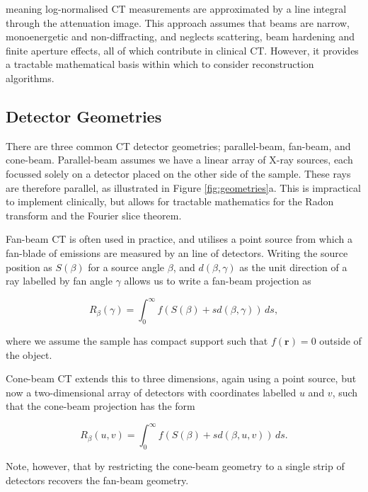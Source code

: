 meaning log-normalised CT measurements are approximated by a line integral through the attenuation image. This approach assumes that beams are narrow, monoenergetic and non-diffracting, and neglects scattering, beam hardening and finite aperture effects, all of which contribute in clinical CT. However, it provides a tractable mathematical basis within which to consider reconstruction algorithms.

\subsection{Detector Geometries}
\label{subsec:detector_geometries}

There are three common CT detector geometries; parallel-beam, fan-beam, and cone-beam. Parallel-beam assumes we have a linear array of X-ray sources, each focussed solely on a detector placed on the other side of the sample. These rays are therefore parallel, as illustrated in Figure \ref{fig:geometries}a. This is impractical to implement clinically, but allows for tractable mathematics for the Radon transform and the Fourier slice theorem.

Fan-beam CT is often used in practice, and utilises a point source from which a fan-blade of emissions are measured by an line of detectors. Writing the source position as $S(\beta)$ for a source angle $\beta$, and $d(\beta, \gamma)$ as the unit direction of a ray labelled by fan angle $\gamma$ allows us to write a fan-beam projection as

\begin{equation}
R_\beta(\gamma) = \int_0^\infty f(S(\beta)+sd(\beta, \gamma))\, ds,
\label{eq:fan_beam_projection}
\end{equation}

where we assume the sample has compact support such that $f(\mathbf{r})=0$ outside of the object.

Cone-beam CT extends this to three dimensions, again using a point source, but now a two-dimensional array of detectors with coordinates labelled $u$ and $v$, such that the cone-beam projection has the form

\begin{equation}
R_\beta(u,v)=\int_0^\infty f(S(\beta)+sd(\beta, u,v))\, ds.
\label{eq:cone_beam_projection}
\end{equation}

Note, however, that by restricting the cone-beam geometry to a single strip of detectors recovers the fan-beam geometry.

